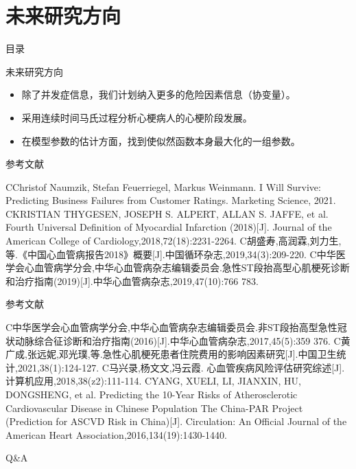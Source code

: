 \documentclass{beamer}
\begin{document}
\section{未来研究方向}
\begin{frame}{目录}
\tableofcontents[sectionstyle=show/shaded,subsectionstyle=show/shaded/hide]
\end{frame}

\begin{frame}{未来研究方向}
\begin{itemize}
    \item 除了并发症信息，我们计划纳入更多的危险因素信息（协变量）。
    \item 采用连续时间马氏过程分析心梗病人的心梗阶段发展。
    \item 在模型参数的估计方面，找到使似然函数本身最大化的一组参数。
\end{itemize}
\end{frame}

\begin{frame}{参考文献}
\begin{thebibliography}{99}
\bibitem CChristof Naumzik, Stefan Feuerriegel, Markus Weinmann. I Will Survive: Predicting Business Failures from Customer Ratings. Marketing Science, 2021.
\bibitem  
CKRISTIAN THYGESEN, JOSEPH S. ALPERT, ALLAN S. JAFFE, et al. Fourth Universal Definition of Myocardial Infarction (2018)[J].  Journal of the American College of Cardiology,2018,72(18):2231-2264.
\bibitem C胡盛寿,高润霖,刘力生,等.《中国心血管病报告2018》概要[J].中国循环杂志,2019,34(3):209-220.
\bibitem C中华医学会心血管病学分会,中华心血管病杂志编辑委员会.急性ST段抬高型心肌梗死诊断和治疗指南(2019)[J].中华心血管病杂志,2019,47(10):766 783.
\end{thebibliography}
\end{frame}

\begin{frame}{参考文献}
\begin{thebibliography}{99}
\bibitem
C中华医学会心血管病学分会,中华心血管病杂志编辑委员会.非ST段抬高型急性冠状动脉综合征诊断和治疗指南(2016)[J].中华心血管病杂志,2017,45(5):359 376.
\bibitem C黄广成,张远妮,邓光璞,等.急性心肌梗死患者住院费用的影响因素研究[J].中国卫生统计,2021,38(1):124-127.
\bibitem C马兴录,杨文文,冯云霞. 心血管疾病风险评估研究综述[J]. 计算机应用,2018,38(z2):111-114.
\bibitem 
CYANG, XUELI, LI, JIANXIN, HU, DONGSHENG, et al. Predicting the 10-Year Risks of Atherosclerotic Cardiovascular Disease in Chinese Population The China-PAR Project (Prediction for ASCVD Risk in China)[J].  Circulation: An Official Journal of the American Heart Association,2016,134(19):1430-1440. 
\end{thebibliography}
\end{frame}

\begin{frame}{Q\&A}
\tableofcontents
\end{frame}
\end{document}

